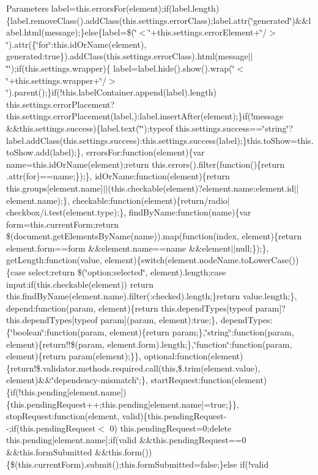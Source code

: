 {\begin{DoxyParams}{Parameters}
label=this.\+errors\+For(element);if(label.\+length)\{label.\+remove\+Class().add\+Class(this.\+settings.\+error\+Class);label.\+attr(\char`\"{}generated\char`\"{})\&\&label.\+html(message);\}else\{label=\$(\char`\"{}$<$\char`\"{}+this.settings.\+error\+Element+\char`\"{}/$>$\char`\"{}).attr(\{\char`\"{}for\char`\"{}\+:this.\+id\+Or\+Name(element), generated\+:true\}).add\+Class(this.\+settings.\+error\+Class).html(message$\vert$$\vert$\char`\"{}\char`\"{});if(this.\+settings.\+wrapper)\{ label=label.\+hide().show().wrap(\char`\"{}$<$\char`\"{}+this.settings.\+wrapper+\char`\"{}/$>$\char`\"{}).parent();\}if(!this.label\+Container.\+append(label).length) this.\+settings.\+error\+Placement?this.\+settings.\+error\+Placement(label,)\+:label.\+insert\+After(element);\}if(!message \&\&this.\+settings.\+success)\{label.\+text(\char`\"{}\char`\"{});typeof this.\+settings.\+success==\char`\"{}string\char`\"{}?label.\+add\+Class(this.\+settings.\+success)\+:this.\+settings.\+success(label);\}this.\+to\+Show=this.\+to\+Show.\+add(label);\}, errors\+For\+:function(element)\{var name=this.\+id\+Or\+Name(element);return this.\+errors().filter(function()\{return .attr(\textquotesingle{}for\textquotesingle{})==name;\});\}, id\+Or\+Name\+:function(element)\{return this.\+groups\mbox{[}element.\+name\mbox{]}$\vert$$\vert$(this.\+checkable(element)?element.\+name\+:element.\+id$\vert$$\vert$element.name);\}, checkable\+:function(element)\{return/radio$\vert$checkbox/i.test(element.\+type);\}, find\+By\+Name\+:function(name)\{var form=this.\+current\+Form;return \$(document.\+get\+Elements\+By\+Name(name)).map(function(index, element)\{return element.\+form==form \&\&element.\+name==name \&\&element$\vert$$\vert$null;\});\}, get\+Length\+:function(value, element)\{switch(element.\+node\+Name.\+to\+Lower\+Case())\{case \textquotesingle{}select\textquotesingle{}\+:return \$(\char`\"{}option\+:selected\char`\"{}, element).length;case \textquotesingle{}input\textquotesingle{}\+:if(this.\+checkable(element)) return this.\+find\+By\+Name(element.\+name).filter(\textquotesingle{}\+:checked\textquotesingle{}).length;\}return value.\+length;\}, depend\+:function(param, element)\{return this.\+depend\+Types\mbox{[}typeof param\mbox{]}?this.\+depend\+Types\mbox{[}typeof param\mbox{]}(param, element)\+:true;\}, depend\+Types\+:\{\char`\"{}boolean\char`\"{}\+:function(param, element)\{return param;\},\char`\"{}string\char`\"{}\+:function(param, element)\{return!!\$(param, element.\+form).length;\},\char`\"{}function\char`\"{}\+:function(param, element)\{return param(element);\}\}, optional\+:function(element)\{return!\$.validator.\+methods.\+required.\+call(this,\$.trim(element.\+value), element)\&\&\char`\"{}dependency-\/mismatch\char`\"{};\}, start\+Request\+:function(element)\{if(!this.pending\mbox{[}element.\+name\mbox{]})\{this.\+pending\+Request++;this.\+pending\mbox{[}element.\+name\mbox{]}=true;\}\}, stop\+Request\+:function(element, valid)\{this.\+pending\+Request-\/-\/;if(this.\+pending\+Request$<$ 0) this.\+pending\+Request=0;delete this.\+pending\mbox{[}element.\+name\mbox{]};if(valid \&\&this.\+pending\+Request==0 \&\&this.\+form\+Submitted \&\&this.\+form())\{\$(this.\+current\+Form).submit();this.\+form\+Submitted=false;\}else if(!valid 
\end{DoxyParams}}
